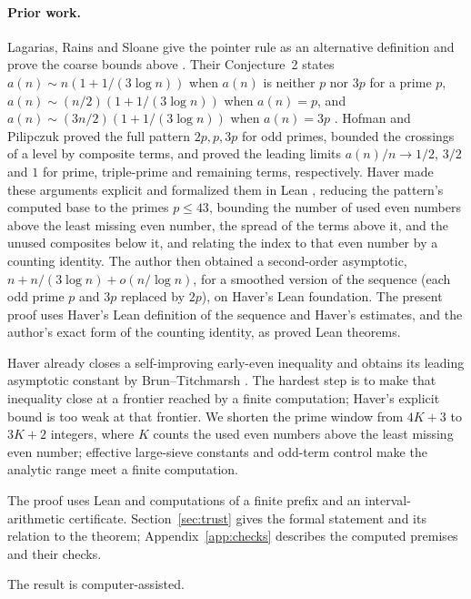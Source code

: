 \documentclass[11pt]{article}
\theoremstyle{definition}
\theoremstyle{remark}
\begin{document}
\paragraph{Prior work.}
Lagarias, Rains and Sloane give the pointer rule as an alternative
definition \cite[eq.~(2)]{lrs} and prove the coarse bounds above
\cite[Theorems~2--3]{lrs}. Their Conjecture~2 states
$a(n)\sim n(1+1/(3\log n))$ when $a(n)$ is neither $p$ nor $3p$ for a
prime $p$, $a(n)\sim(n/2)(1+1/(3\log n))$ when $a(n)=p$, and
$a(n)\sim(3n/2)(1+1/(3\log n))$ when $a(n)=3p$ \cite[Conjecture~2]{lrs}.
Hofman and Pilipczuk
\cite[Theorems~4.3, 4.17, Lemma~4.5 and Corollary~4.12]{hp} proved the full pattern
$2p,p,3p$ for odd primes, bounded the crossings of a level by composite terms,
and proved the leading limits $a(n)/n\to1/2$, $3/2$ and $1$ for prime,
triple-prime and remaining terms, respectively. Haver made these arguments
explicit and formalized them in Lean
\cite[(F2), Theorems~5, 8, 11 and Corollary~12(b)]{haver},
reducing the pattern's computed base to the primes $p\le43$, bounding the
number of used even numbers above the least missing even number, the
spread of the terms above it, and the unused composites below it, and relating the index to
that even number by a counting identity. The author \cite{graham}
then obtained a second-order asymptotic, $n+n/(3\log n)+o(n/\log n)$, for
a smoothed version of the sequence (each odd prime $p$ and $3p$ replaced by $2p$),
on Haver's Lean foundation. The present proof uses Haver's Lean
definition of the sequence and Haver's estimates, and the author's exact form
of the counting identity, as proved Lean theorems.

Haver already closes a self-improving early-even inequality and obtains
its leading asymptotic constant by Brun--Titchmarsh
\cite[Lemma~4, Theorem~5, Remark~6(b)]{haver}. The hardest step is to make
that inequality close at a frontier reached by a finite computation;
Haver's explicit bound is too weak at that frontier. We shorten the
prime window from $4K+3$ to $3K+2$ integers, where $K$ counts the used
even numbers above the least missing even number; effective large-sieve constants
and odd-term control make the analytic range meet a finite computation.

The proof uses Lean and computations of a finite prefix and an
interval-arithmetic certificate. Section~\ref{sec:trust} gives the formal
statement and its relation to the theorem; Appendix~\ref{app:checks}
describes the computed premises and their checks.

 The result is computer-assisted. 
\end{document}
